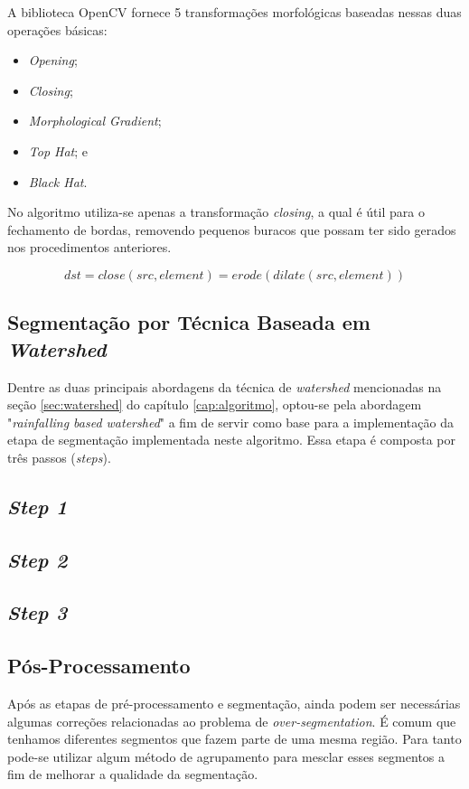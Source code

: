 A biblioteca OpenCV fornece 5 transformações morfológicas baseadas nessas duas operações básicas:
\begin{itemize}
    \item \textit{Opening};
    \item \textit{Closing};
    \item \textit{Morphological Gradient};
    \item \textit{Top Hat}; e 
    \item \textit{Black Hat}.
\end{itemize} 

No algoritmo utiliza-se apenas a transformação \textit{closing}, a qual é útil para o fechamento de bordas, removendo pequenos buracos que possam ter sido gerados nos procedimentos anteriores.

\[dst = close(src, element) = erode(dilate(src, element))\]


\subsection{Segmentação por Técnica Baseada em \textit{Watershed}}
Dentre as duas principais abordagens da técnica de \textit{watershed} mencionadas na seção \ref{sec:watershed} do capítulo \ref{cap:algoritmo}, optou-se pela abordagem "\textit{rainfalling based watershed}" a fim de servir como base para a implementação da etapa de segmentação implementada neste algoritmo. Essa etapa é composta por três passos (\textit{steps}). 

\subsection*{\textit{Step 1}}
 
\subsection*{\textit{Step 2}}

\subsection*{\textit{Step 3}}

\subsection{Pós-Processamento}
Após as etapas de pré-processamento e segmentação, ainda podem ser necessárias algumas correções relacionadas ao problema de \textit{over-segmentation}. É comum que tenhamos diferentes segmentos que fazem parte de uma mesma região. Para tanto pode-se utilizar algum método de  agrupamento para mesclar esses segmentos a fim de melhorar a qualidade da segmentação.